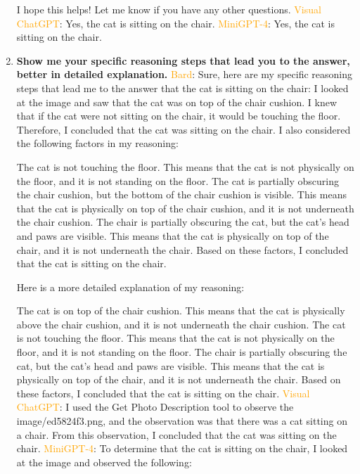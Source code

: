 \begin{enumerate}
        I hope this helps! Let me know if you have any other questions.
        \subitem \textcolor{orange}{Visual ChatGPT}: Yes, the cat is sitting on the chair.
        \subitem \textcolor{orange}{MiniGPT-4}: Yes, the cat is sitting on the chair.
        \item \textbf{Show me your specific reasoning steps that lead you to the answer, better in detailed explanation.}
        \subitem \textcolor{orange}{Bard}: 
        Sure, here are my specific reasoning steps that lead me to the answer that the cat is sitting on the chair:
        I looked at the image and saw that the cat was on top of the chair cushion.
        I knew that if the cat were not sitting on the chair, it would be touching the floor.
        Therefore, I concluded that the cat was sitting on the chair.
        I also considered the following factors in my reasoning:

        The cat is not touching the floor. This means that the cat is not physically on the floor, and it is not standing on the floor.
        The cat is partially obscuring the chair cushion, but the bottom of the chair cushion is visible. This means that the cat is physically on top of the chair cushion, and it is not underneath the chair cushion.
        The chair is partially obscuring the cat, but the cat's head and paws are visible. This means that the cat is physically on top of the chair, and it is not underneath the chair.
        Based on these factors, I concluded that the cat is sitting on the chair.

        Here is a more detailed explanation of my reasoning:

        The cat is on top of the chair cushion. This means that the cat is physically above the chair cushion, and it is not underneath the chair cushion.
        The cat is not touching the floor. This means that the cat is not physically on the floor, and it is not standing on the floor.
        The chair is partially obscuring the cat, but the cat's head and paws are visible. This means that the cat is physically on top of the chair, and it is not underneath the chair.
        Based on these factors, I concluded that the cat is sitting on the chair.
        \subitem \textcolor{orange}{Visual ChatGPT}: I used the Get Photo Description tool to observe the image/ed5824f3.png, and the observation was that there was a cat sitting on a chair. From this observation, I concluded that the cat was sitting on the chair.
        \subitem \textcolor{orange}{MiniGPT-4}: To determine that the cat is sitting on the chair, I looked at the image and observed the following:


\end{enumerate}
